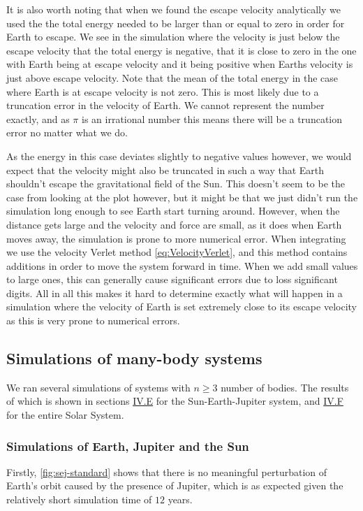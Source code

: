 \documentclass[reprint,english,notitlepage]{revtex4-1}  %
\begin{document}
It is also worth noting that when we found the escape velocity analytically we used the the total energy needed to be larger than or equal to zero in order for Earth to escape. We see in the simulation where the velocity is just below the escape velocity that the total energy is negative, that it is close to zero in the one with Earth being at escape velocity and it being positive when Earths velocity is just above escape velocity. Note that the mean of the total energy in the case where Earth is at escape velocity is not zero. This is most likely due to a truncation error in the velocity of Earth. We cannot represent the number exactly, and as $\pi$ is an irrational number this means there will be a truncation error no matter what we do.

As the energy in this case deviates slightly to negative values however, we would expect that the velocity might also be truncated in such a way that Earth shouldn't escape the gravitational field of the Sun. This doesn't seem to be the case from looking at the plot however, but it might be that we just didn't run the simulation long enough to see Earth start turning around. However, when the distance gets large and the velocity and force are small, as it does when Earth moves away, the simulation is prone to more numerical error. When integrating we use the velocity Verlet method \eqref{eq:VelocityVerlet}, and this method contains additions in order to move the system forward in time. When we add small values to large ones, this can generally cause significant errors due to loss significant digits. All in all this makes it hard to determine exactly what will happen in a simulation where the velocity of Earth is set extremely close to its escape velocity as this is very prone to numerical errors.




\subsection{Simulations of many-body systems} \label{sec:V:c}
We ran several simulations of systems with \(n\geq3\) number of bodies. The results of which is shown in sections \hyperref[sec:IV:e]{IV.E} for the Sun-Earth-Jupiter system, and \hyperref[sec:IV:f]{IV.F} for the entire Solar System.

\subsubsection{Simulations of Earth, Jupiter and the Sun} \label{sec:V:c:i}
Firstly, \ref{fig:sej-standard} shows that there is no meaningful perturbation of Earth's orbit caused by the presence of Jupiter, which is as expected given the relatively short simulation time of \(12\) years.
\end{document}
